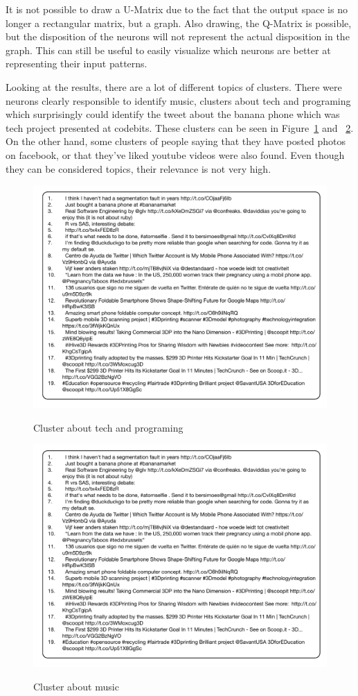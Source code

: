 \documentclass[journal]{IEEEtran}
\begin{document}
It is not possible to draw a \ac{U-Matrix} due to the fact that the output space is no longer a rectangular matrix, but a graph. Also drawing, the \ac{Q-Matrix} is possible, but the disposition of the neurons will not represent the actual disposition in the graph. This can still be useful to easily visualize which neurons are better at representing their input patterns. 

Looking at the results, there are a lot of different topics of clusters. There were neurons clearly responsible to identify music, clusters about tech and programing which surprisingly could identify the tweet about the banana phone which was tech project presented at codebits. These clusters can be seen in Figure~\ref{clust:tech} and ~\ref{clust:music}.
On the other hand, some clusters of people saying that they have posted photos on facebook, or that they've liked youtube videos were also found. Even though they can be considered topics, their relevance is not very high.

\begin{figure}[h]
  \centering
  \includegraphics[width=0.8\linewidth]{./images/1clustertech.pdf}
  \label{clust:tech}
  \caption{Cluster about tech and programing}
\end{figure}

\begin{figure}[h]
  \centering
  \includegraphics[width=0.8\linewidth]{./images/2clustertech.pdf}
  \label{clust:music}
  \caption{Cluster about music}
\end{figure}
               
\end{document}
